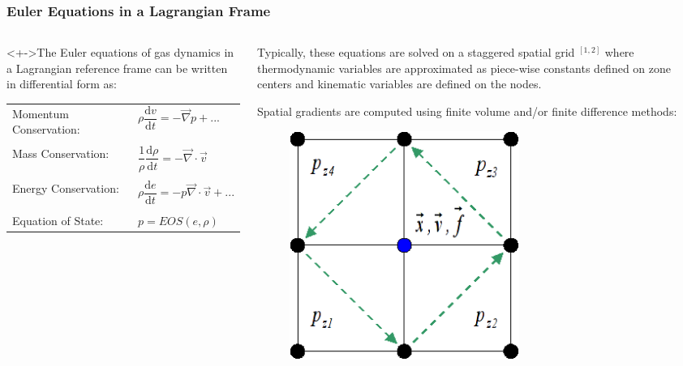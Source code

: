 \documentclass[8pt,xcolor=svgnames]{beamer}
\begin{document}
\begin{frame}
  \frametitle{Euler Equations in a Lagrangian Frame}
\begin{columns}
  \begin{column}{0.55\textwidth}
    \begin{block}<+->{The Euler equations of gas dynamics in a Lagrangian reference frame can be written in differential form as:}
    \bigskip 
    
\begin{tabular}{ll}
Momentum Conservation: & $\rho \dfrac{\mathrm{d} v}{\mathrm{d} t}=-\vec{\nabla} p + ...$ \\ \\
Mass Conservation: & $\dfrac{1}{\rho}\dfrac{\mathrm{d} \rho}{\mathrm{d} t}=-\vec{\nabla}\cdot \vec{v} $ \\ \\
Energy Conservation: & $\rho \dfrac{\mathrm{d} e}{\mathrm{d} t} =-p\vec{\nabla}\cdot \vec{v} +...$ \\ \\
Equation of State: & $p=EOS(e, \rho)$ \\
\end{tabular}
    \end{block}
  \end{column}
  \begin{column}{0.35\textwidth}
  \bigskip 
  
  Typically, these equations are solved on a staggered spatial grid $^{[1,2]}$ where thermodynamic variables are approximated as piece-wise constants defined on zone centers and kinematic variables are defined on the nodes.
  
\medskip

Spatial gradients are computed using finite volume and/or finite difference methods:
    \begin{figure}[h!]
 \centering
 \includegraphics[width=0.6\textwidth,keepaspectratio=true]{./Images/HEMPLagHydro.png}
\end{figure}
  \end{column}
\end{columns}


\end{frame}
\end{document}
